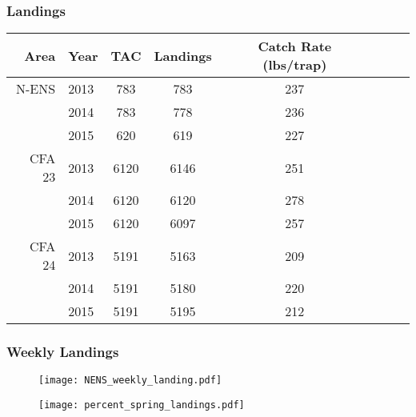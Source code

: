 \begin{frame}
\frametitle{Landings}

\begin{table}[ht]
\centering
\begin{tabular}{rlccclrr}
  \hline
  Area & Year & TAC & Landings & Catch Rate (lbs/trap) \\ 
  \hline
 N-ENS & 2013 & 783 & 783 & 237 \\ 
 & 2014 & 783 & 778 & 236 \\
 & 2015 & 620 & 619 & 227 \\
\hline
 CFA 23 & 2013 & 6120 & 6146 & 251 \\ 
 & 2014 & 6120 & 6120 & 278 \\
 & 2015 & 6120 & 6097 & 257 \\
\hline
 CFA 24 & 2013 & 5191 & 5163 & 209 \\ 
 & 2014 & 5191 & 5180 & 220 \\
 & 2015 & 5191 & 5195 & 212 \\



\hline
   \hline
\end{tabular}
\end{table}



\end{frame}



\begin{frame}
\frametitle{Weekly Landings}
\begin{figure}

 \vspace*{-0.5cm}
 \centerline{\texttt{[image: NENS\_weekly\_landing.pdf]}}

 \end{figure}
\end{frame}


\begin{frame}
\begin{figure}

 \vspace*{-0.25cm}
 \centerline{\texttt{[image: percent\_spring\_landings.pdf]}}

 \end{figure}
\end{frame}

